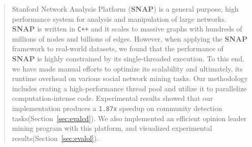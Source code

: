 \begin{abstract}
  Stanford Network Analysis Platform (\textbf{SNAP}) is a general purpose, high
  performance system for analysis and manipulation of large networks.
  \textbf{SNAP} is written in \texttt{C++} and it scales to massive graphs with hundreds
  of millions of nodes and billions of edges. However, when applying the \textbf{SNAP}
  framework to real-world datasets, we found that the performance of \textbf{SNAP}
  is highly constrained by its single-threaded execution. To this end, we have made
  manual efforts to optimize its scalability and ultimately, its runtime overhead 
  on various social network mining tasks. Our methodology includes crating a high-performance 
  thread pool and utilize it to parallelize computation-intense code. Experimental 
		results showed that our implementation produces a \texttt{1.87x} speedup on community detection tasks(Section~\ref{sec:evalcd}).
  We also implemented an efficient opinion leader mining program with this platform, and 
		visualized experimental results(Section~\ref{sec:evalol}).
\end{abstract}

